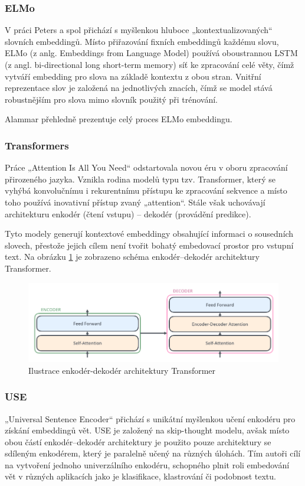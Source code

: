 \documentclass[thesis=M,czech]{FITthesis}[2019/12/23]
\begin{document}
\subsubsection*{ELMo}
V práci Peters a spol\cite{peters2018} přichází s myšlenkou hluboce „kontextualizovaných“ slovních embeddingů. Místo přiřazování fixních embeddingů každému slovu, ELMo (z anlg. Embeddings from Language Model) používá oboustrannou LSTM (z angl. bi-directional long short-term memory) síť ke zpracování celé věty, čímž vytváří embedding pro slova na základě kontextu z obou stran. Vnitřní reprezentace slov je založená na jednotlivých znacích, čímž se model stává robustnějším pro slova mimo slovník použitý při trénování.

Alammar\cite{alammar2018} přehledně prezentuje celý proces ELMo embeddingu.

\subsubsection*{Transformers}
Práce „Attention Is All You Need“\cite{vaswani2017} odstartovala novou éru v oboru zpracování přirozeného jazyka. Vznikla rodina modelů typu tzv. Transformer, který se vyhýbá konvolučnímu i rekurentnímu přístupu ke zpracování sekvence a místo toho používá inovativní přístup zvaný „attention“. Stále však uchovávají architekturu enkodér (čtení vstupu) -- dekodér (provádění predikce).

Tyto modely generují kontextové embeddingy obsahující informaci o sousedních slovech, přestože jejich cílem není tvořit bohatý embedovací prostor pro vstupní text.
 Na obrázku \ref{fig:alammar2018transformer} je zobrazeno schéma enkodér--dekodér architektury Transformer.
\begin{figure}\centering
	\includegraphics[width=\textwidth]{images/alammar2018_transformer.png}
	\caption{Ilustrace enkodér-dekodér architektury Transformer\cite{palachy2019}}\label{fig:alammar2018transformer}
\end{figure}

\subsubsection*{USE}
„Universal Sentence Encoder“\cite{cer2018} přichází s unikátní myšlenkou učení enkodéru pro získání embeddingů vět. USE je založený na skip-thought modelu, avšak místo obou částí enkodér--dekodér architektury je použito pouze architektury se sdíleným enkodérem, který je paralelně učený na různých úlohách. Tím autoři cílí na vytvoření jednoho univerzálního enkodéru, schopného plnit roli embedování vět v různých aplikacích jako je klasifikace, klastrování či podobnost textu.
\end{document}
